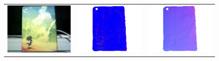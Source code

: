 \begin{figure}[!ht]
\centering
\setlength{\tabcolsep}{0.1em} %
 {\renewcommand{\arraystretch}{1.6}%
\begin{tabular}{c|c c}
   \includegraphics[height = 0.24\linewidth]{figures/result/robust_padback_rgb.pdf} 
   &
   \includegraphics[height = 0.23\linewidth]{figures/result/rgbd_padback_normal.pdf} &
   \includegraphics[height = 0.23\linewidth]{figures/result/robust_padback_normal.pdf} \\


\end{tabular}}
\end{figure}
